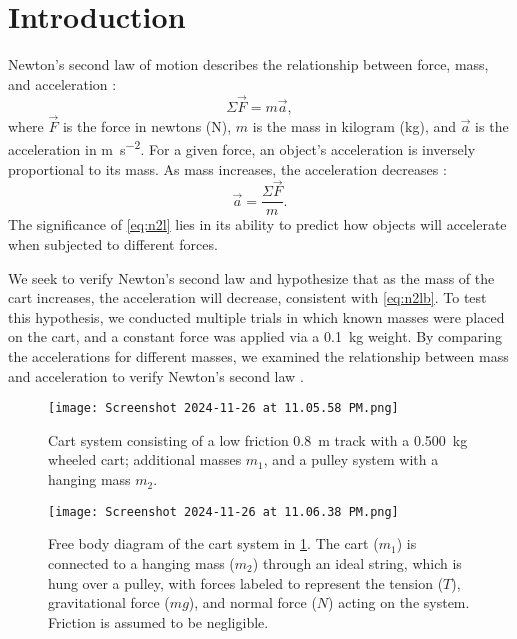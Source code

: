 ﻿\documentclass[reprint,amsmath,amssymb,aps]{revtex4-2}
\begin{document}
\section{Introduction}
Newton’s second law of motion describes the relationship between force, mass, and acceleration \cite{knight2017physics}: 
\begin{equation}
\Sigma \vec{F} = m \vec{a},
\label{eq:n2l}
\end{equation}
where $\vec{F}$ is the force in newtons (\unit{\newton}), $m$ is the mass in kilogram (\unit{\kilo\gram}), and $\vec{a}$ is the acceleration in \unit{\meter\per\second\squared}. For a given force, an object’s acceleration is inversely proportional to its mass. As mass increases, the acceleration decreases \cite{knight2017physics}:   
\begin{equation}
\vec{a} = \dfrac{\Sigma \vec{F}}{m}.
\label{eq:n2lb}
\end{equation}
The significance of \cref{eq:n2l} lies in its ability to predict how objects will accelerate when subjected to different forces. 

We seek to verify Newton’s second law and hypothesize that as the mass of the cart increases, the acceleration will decrease, consistent with \cref{eq:n2lb}. To test this hypothesis, we conducted multiple trials in which known masses were placed on the cart, and a constant force was applied via a \qty{0.1}{\kilo\gram} weight. By comparing the accelerations for different masses, we examined the relationship between mass and acceleration to verify Newton’s second law \cite{knight2017physics}.

\begin{figure}
\begin{center}
\texttt{[image: Screenshot 2024-11-26 at 11.05.58 PM.png]}
\end{center}
\caption{\label{fig:materials} Cart system consisting of a low friction \qty{0.8}{\meter} track with a \qty{0.500}{\kilo\gram} wheeled cart; additional masses $m_1$, and a pulley system with a hanging mass $m_2$.}
\end{figure}

\begin{figure}
\begin{center}
\texttt{[image: Screenshot 2024-11-26 at 11.06.38 PM.png]}
\end{center}
\caption{\label{fig:fbd} Free body diagram of the cart system in \cref{fig:materials}. The cart ($m_1$) is connected to a hanging mass ($m_2$) through an ideal string, which is hung over a pulley, with forces labeled to represent the tension ($T$), gravitational force ($mg$), and normal force ($N$) acting on the system. Friction is assumed to be negligible.}
\end{figure}
\end{document}
